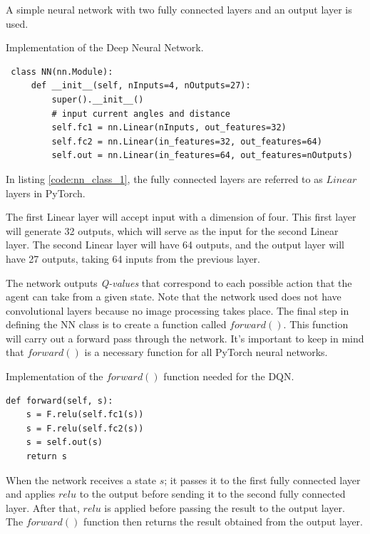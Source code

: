 \documentclass[12pt,oneside]{article}
\begin{document}
A simple neural network with two fully connected layers and an output layer is used.
\begin{listing}[htbp]
\caption{Implementation of the Deep Neural Network.}
\label{code:nn_class_1}
\begin{tcolorbox}[]
\begin{verbatim}
 class NN(nn.Module):
     def __init__(self, nInputs=4, nOutputs=27):
         super().__init__()
         # input current angles and distance
         self.fc1 = nn.Linear(nInputs, out_features=32)
         self.fc2 = nn.Linear(in_features=32, out_features=64)
         self.out = nn.Linear(in_features=64, out_features=nOutputs)
\end{verbatim}
\end{tcolorbox}
\end{listing} 

In listing \ref{code:nn_class_1}, the fully connected layers are referred to as $Linear$ layers in PyTorch.

The first Linear layer will accept input with a dimension of four. This first layer will generate 32 outputs, which will serve as the input for the second Linear layer. The second Linear layer will have 64 outputs, and the output layer will have 27 outputs, taking 64 inputs from the previous layer.

The network outputs \textit{Q-values} that correspond to each possible action that the agent can take from a given state. Note that the network used does not have convolutional layers because no image processing takes place.
The final step in defining the NN class is to create a function called $forward()$. This function will carry out a forward pass through the network. It's important to keep in mind that $forward()$ is a necessary function for all PyTorch neural networks.

\begin{listing}[htbp]
\caption{Implementation of the $forward()$ function needed for the DQN.}
\label{code:nn_class_2}
\begin{tcolorbox}[]
\begin{verbatim}
def forward(self, s):
    s = F.relu(self.fc1(s))
    s = F.relu(self.fc2(s))
    s = self.out(s)
    return s
\end{verbatim}
\end{tcolorbox}
\end{listing} 
When the network receives a state $s$; it passes it to the first fully connected layer and applies $relu$ to the output before sending it to the second fully connected layer. After that, $relu$ is applied before passing the result to the output layer. The $forward()$ function then returns the result obtained from the output layer.
\end{document}
